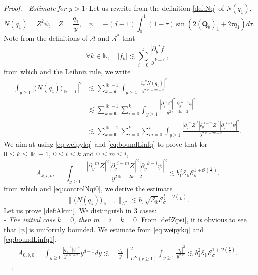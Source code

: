 \documentclass[11pt]{aims}
\theoremstyle{definition}
\numberwithin{equation}{section}
\begin{document}
\begin{proof}
\noindent - \textit{Estimate for $y > 1$:} Let us rewrite from the definition \eqref{def:Nq} of $N(q_1)$,
\begin{equation}\label{def:Zpsi}
N(q_1) = Z^2 \psi, \quad Z = \frac{q_1}{y}, \quad \psi = -(d-1)\int_0^1(1 - \tau)\sin(2(\mathbf{Q}_b)_1 + 2\tau q_1) d\tau.
\end{equation}
Note from the definitions of ${\mathscr{A}}$ and ${\mathscr{A}}^*$ that 
$$\forall k \in \mathbb{N}, \quad |f_k| \lesssim \sum_{i = 0}^{k} \frac{|{\partial_y}^i f|}{y^{k- i}},$$
from which and the Leibniz rule, we write 
\begin{align*}
\int_{y \geq 1}\left|\big(N(q_1)\big)_{\Bbbk - 1}\right|^2 &\lesssim \sum_{k = 0}^{\Bbbk - 1}\int_{y \geq 1}\frac{|{\partial_y}^kN(q_1)|^2}{y^{2\Bbbk - 2k - 2}}\\
&\lesssim \sum_{k = 0}^{\Bbbk - 1}\sum_{i = 0}^k \int_{y \geq 1} \frac{|{\partial_y}^i Z^2|^2|{\partial_y}^{k - i}\psi|^2}{y^{2\Bbbk - 2k - 2}}\\
&\lesssim \sum_{k = 0}^{\Bbbk - 1}\sum_{i = 0}^k \sum_{m = 0}^i \int_{y \geq 1} \frac{|{\partial_y}^m Z|^2 |{\partial_y}^{i - m}Z|^2 |{\partial_y}^{k - i}\psi|^2}{y^{2\Bbbk - 2k - 2}}.
\end{align*}
We aim at using \eqref{eq:weipykq} and \eqref{eq:boundLinfq} to prove that for $0 \leq k \leq \Bbbk - 1$, $0 \leq i \leq k$ and $0 \leq m \leq i$,
\begin{equation}\label{def:Akmi}
A_{k,i,m} := \int_{y \geq 1} \frac{|{\partial_y}^m Z|^2 |{\partial_y}^{i - m}Z|^2 |{\partial_y}^{k - i}\psi|^2}{y^{2\Bbbk - 2k - 2}} \lesssim b_1^{2}{\mathscr{E}}_\Bbbk{\mathscr{E}}_\sigma^{1 + {\mathcal{O}}\left(\frac{1}{L} \right)}.
\end{equation}
from which and \eqref{eq:controlNqi0}, we derive the estimate 
\begin{equation}\label{eq:controlNq1}
\|\big(N(q_1)\big)_{\Bbbk - 1}\|_{L^2} \lesssim b_1\sqrt{{\mathscr{E}}_\Bbbk}{\mathscr{E}}_\sigma^{\frac 12 + {\mathcal{O}}\left(\frac{1}{L} \right)}.
\end{equation}
Let us prove \eqref{def:Akmi}. We distinguish in 3 cases:\\
\noindent - \underline{\textit{The initial case $k = 0$, then $m = i = k = 0$.}}  From \eqref{def:Zpsi}, it is obvious to see that $|\psi|$ is uniformly bounded.  We estimate from \eqref{eq:weipykq} and \eqref{eq:boundLinfq1}, 
\begin{align*}
A_{0,0,0}  = \int_{y \geq 1} \frac{|q_1|^4|\psi|^2}{y^{2\Bbbk + 2}} y^{d-1}dy  \lesssim  \left\| \frac{q_1}{y}\right\|^2_{L^\infty(y \geq 1)} \int_{y \geq 1} \frac{|q_1|^2}{y^{2\Bbbk}} \lesssim b_1^2{\mathscr{E}}_\Bbbk{\mathscr{E}}_\sigma^{1 + {\mathcal{O}}\left(\frac{1}{L} \right)}.

\end{align*}
\end{proof}
\end{document}

